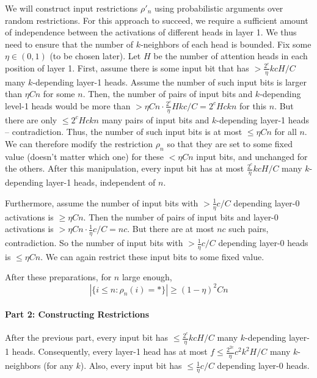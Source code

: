 \documentclass[11pt,a4paper]{article}
\begin{document}
We will construct input restrictions $\rho'_n$ using probabilistic arguments over random restrictions.
For this approach to succeed, we require a  sufficient amount of independence between the activations of different heads in layer 1.
We thus need to ensure that the number of $k$-neighbors of each head is bounded.
Fix some $\eta \in (0,1)$ (to be chosen later).
Let $H$ be the number of attention heads in each position of layer 1.
First, assume there is some input bit that has $>\frac{2^c}{\eta}kcH/C$ many $k$-depending layer-1 heads.
Assume the number of such input bits is larger than $\eta Cn$ for some $n$.
Then, the number of pairs of input bits and $k$-depending level-1 heads would be more than $> \eta C n \cdot \frac{2^c}{\eta} H k c/C = 2^c Hckn$ for this $n$.
But there are only $\leq 2^c Hckn$ many pairs of input bits and $k$-depending layer-1 heads -- contradiction.
Thus, the number of such input bits is at most $\leq \eta Cn$ for all $n$.
We can therefore modify the restriction $\rho_n$ so that they are set to some fixed value (doesn't matter which one) for these $<\eta Cn$ input bits, and unchanged for the others.
After this manipulation, every input bit has at most $\frac{2^c}{\eta}kcH/C$ many $k$-depending layer-1 heads, independent of $n$.

Furthermore, assume the number of input bits with $> \frac{1}{\eta} c/C$ depending layer-0 activations is $\geq \eta Cn$.
Then the number of pairs of input bits and layer-0 activations is $>\eta Cn \cdot \frac{1}{\eta} c/C = nc$.
But there are at most $nc$ such pairs, contradiction.
So the number of input bits with $> \frac{1}{\eta} c/C$ depending layer-0 heads is $\leq \eta Cn$.
We can again restrict these input bits to some fixed value. %

After these preparations, for $n$ large enough,
\begin{equation}
|\{i \leq n: \rho_n(i) = *\}| \geq (1-\eta)^2 C n
\end{equation}

\paragraph{Part 2: Constructing Restrictions}
After the previous part, every input bit has $\leq \frac{2^c}{\eta}kcH/C$ many $k$-depending layer-1 heads.
Consequently, every layer-1 head has at most $f \leq \frac{2^{2c}}{\eta}c^2k^2H/C$ many $k$-neighbors (for any $k$).
Also, every input bit has $\leq \frac{1}{\eta}c/C$ depending layer-0 heads.
\end{document}
